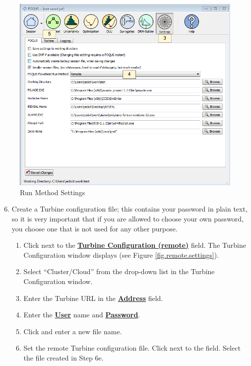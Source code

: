 \begin{figure}[H]
	\begin{center}
		\includegraphics[scale=0.55]{Chapt_flowsheet/figs/settings_turbine_01}
		\caption{Run Method Settings}
		\label{fig.remote.settings1}
	\end{center}
\end{figure}

\begin{enumerate}
\setcounter{enumi}{5}
\item Create a Turbine configuration file; this contains your password in plain text, so it is very important that if you are allowed to choose your own password, you choose one that is not used for any other purpose.
\begin{enumerate}
	\item Click  next to the \textbf{\underline{Turbine Configuration (remote)}} field. The Turbine Configuration window displays (see Figure \ref{fig.remote.settings}).
	\item Select ``Cluster/Cloud'' from the  drop-down list in the Turbine Configuration window.
	\item Enter the Turbine URL in the \textbf{\underline{Address}} field.
	\item Enter the \textbf{\underline{User}} name and \textbf{\underline{Password}}.
	\item Click  and enter a new file name.
	\item Set the remote Turbine configuration file.  Click  next to the  field. Select the file created in Step 6e.
\end{enumerate}
\end{enumerate}

